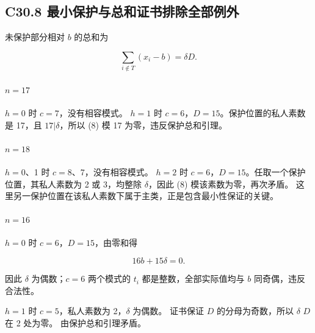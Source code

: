 \documentclass[11pt,a4paper]{article}
\theoremstyle{definition}
\numberwithin{equation}{section}
\begin{document}
\subsection*{\texorpdfstring{{C30.8} {最小保护与总和证书排除全部例外}}{C30.8 最小保护与总和证书排除全部例外}}\label{C30-h198}

{未保护部分相对} {\ensuremath{b}} {的总和为}

\[
\sum_{i\notin T}(x_i-b)=\delta D.
\tag{C30.8}
\]

\paragraph*{\texorpdfstring{{\ensuremath{n=17}}}{}}\label{C30-h199}

{\ensuremath{h=0}} {时} {\ensuremath{c=7}，没有相容模式。} {\ensuremath{h=1}} {时} {\ensuremath{c=6}，\ensuremath{D=15}。保护位置的私人素数是} {17，且} {\ensuremath{17|\delta }，所以} {(8)} {模} {17} {为零，违反保护总和引理。}

\paragraph*{\texorpdfstring{{\ensuremath{n=18}}}{}}\label{C30-h200}

{\ensuremath{h=0}、1} {时} {\ensuremath{c=8}、7，没有相容模式。} {\ensuremath{h=2}} {时} {\ensuremath{c=6}，\ensuremath{D=15}。任取一个保护位置，其私人素数为} {2} {或} {3，均整除} {\ensuremath{\delta }，因此} {(8)} {模该素数为零，再次矛盾。} {这里另一保护位置在该私人素数下属于主类，正是包含最小性保证的关键。}

\paragraph*{\texorpdfstring{{\ensuremath{n=16}}}{}}\label{C30-h201}

{\ensuremath{h=0}} {时} {\ensuremath{c=6}，\ensuremath{D=15}，由零和得}

\[
16b+15\delta=0.
\]

{因此} {\ensuremath{\delta }} {为偶数；\ensuremath{c=6}} {两个模式的} {\ensuremath{t_{i}}} {都是整数，全部实际值均与} {\ensuremath{b}} {同奇偶，违反合法性。}

{\ensuremath{h=1}} {时} {\ensuremath{c=5}，私人素数为} {2，\ensuremath{\delta }} {为偶数。} {证书保证} {\ensuremath{D}} {的分母为奇数，所以} {\ensuremath{\delta }} {\ensuremath{D}} {在} {2} {处为零。} {由保护总和引理矛盾。}
\end{document}
